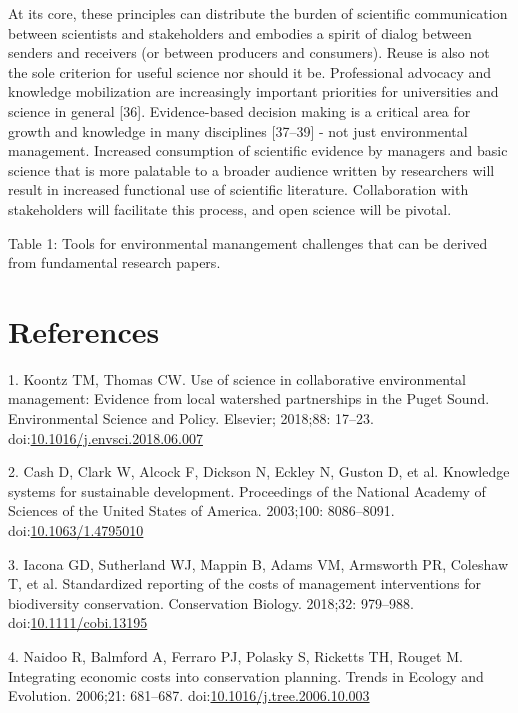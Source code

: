 \documentclass[10pt,letterpaper]{article}
\begin{document}
At its core, these principles can distribute the burden of scientific
communication between scientists and stakeholders and embodies a spirit
of dialog between senders and receivers (or between producers and
consumers). Reuse is also not the sole criterion for useful science nor
should it be. Professional advocacy and knowledge mobilization are
increasingly important priorities for universities and science in
general {[}36{]}. Evidence-based decision making is a critical area for
growth and knowledge in many disciplines {[}37--39{]} - not just
environmental management. Increased consumption of scientific evidence
by managers and basic science that is more palatable to a broader
audience written by researchers will result in increased functional use
of scientific literature. Collaboration with stakeholders will
facilitate this process, and open science will be pivotal.

Table 1: Tools for environmental manangement challenges that can be
derived from fundamental research papers.

\section*{References}\label{references}

\hypertarget{refs}{}
\hypertarget{ref-Koontz2018}{}
1. Koontz TM, Thomas CW. Use of science in collaborative environmental
management: Evidence from local watershed partnerships in the Puget
Sound. Environmental Science and Policy. Elsevier; 2018;88: 17--23.
doi:\href{https://doi.org/10.1016/j.envsci.2018.06.007}{10.1016/j.envsci.2018.06.007}

\hypertarget{ref-Cash2003}{}
2. Cash D, Clark W, Alcock F, Dickson N, Eckley N, Guston D, et al.
Knowledge systems for sustainable development. Proceedings of the
National Academy of Sciences of the United States of America. 2003;100:
8086--8091.
doi:\href{https://doi.org/10.1063/1.4795010}{10.1063/1.4795010}

\hypertarget{ref-Iacona2018}{}
3. Iacona GD, Sutherland WJ, Mappin B, Adams VM, Armsworth PR, Coleshaw
T, et al. Standardized reporting of the costs of management
interventions for biodiversity conservation. Conservation Biology.
2018;32: 979--988.
doi:\href{https://doi.org/10.1111/cobi.13195}{10.1111/cobi.13195}

\hypertarget{ref-Naidoo2006}{}
4. Naidoo R, Balmford A, Ferraro PJ, Polasky S, Ricketts TH, Rouget M.
Integrating economic costs into conservation planning. Trends in Ecology
and Evolution. 2006;21: 681--687.
doi:\href{https://doi.org/10.1016/j.tree.2006.10.003}{10.1016/j.tree.2006.10.003}
\end{document}
